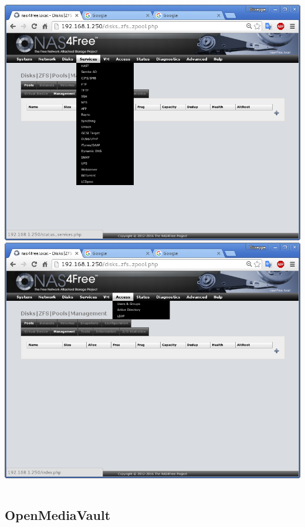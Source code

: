 \documentclass[11pt,xcolor=table]{beamer}
\begin{document}
\begin{frame}
\begin{columns}
\begin{column}{0.48\textwidth}
			\includegraphics[width=\textwidth]{N4F/N4Fscr3.png}\\
			\vspace{3mm}
			\includegraphics[width=\textwidth]{N4F/N4Fscr4.png}\\
		\end{column}
	\end{columns}
\end{frame}

\subsection{OpenMediaVault}
\end{document}
